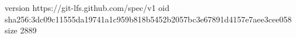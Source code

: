 version https://git-lfs.github.com/spec/v1
oid sha256:3dc09c11555da19741a1c959b818b5452b2057bc3e67891d4157e7aee3cee058
size 2889

